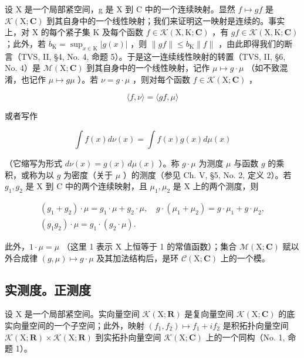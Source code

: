 设 X 是一个局部紧空间，g 是 X 到 C 中的一个连续映射。显然 \(f \mapsto gf\) 是 \(\mathcal{K}(\mathrm{X};\mathbf{C})\) 到其自身中的一个线性映射；我们来证明这一映射是连续的。事实上，对 X 的每个紧子集 K 及每个函数 \(f \in \mathcal{K}(\mathrm{X},\mathrm{K};\mathbf{C})\) ，有 \(gf \in \mathcal{K}(\mathrm{X},\mathrm{K};\mathbf{C})\) ；此外，若 \(b_{\mathrm{K}} = \sup_{x \in \mathrm{K}} |g(x)|\) ，则 \(\|gf\| \leqslant b_{\mathrm{K}} \|f\|\) ，由此即得我们的断言（TVS, II, §4, No. 4, 命题 5）。于是这一连续线性映射的转置（TVS, II, §6, No. 4）是 \(\mathcal{M}(\mathrm{X};\mathbf{C})\) 到其自身中的一个线性映射，记作 \(\mu \mapsto g \cdot \mu\) （如不致混淆，也记作 \(\mu \mapsto g\mu\) ）。若 \(\nu = g \cdot \mu\) ，则对每个函数 \(f \in \mathcal{K}(\mathrm{X};\mathbf{C})\) ，

\[
\langle f, \nu \rangle = \langle g f, \mu \rangle\tag{6}
\]

或者写作

\[
\int f (x) d \nu (x) = \int f (x) g (x) d \mu (x)
\]

（它缩写为形式 \(d\nu(x) = g(x) \, d\mu(x)\) ）。称 \(g \cdot \mu\) 为测度 \(\mu\) 与函数 \(g\) 的乘积，或称为以 \(g\) 为密度（关于 \(\mu\) ）的测度（参见 Ch. V, §5, No. 2, 定义 2）。若 \(g_1, g_2\) 是 X 到 C 中的两个连续映射，且 \(\mu_1, \mu_2\) 是 X 上的两个测度，则

\[
\begin{array}{c} (g _ {1} + g _ {2}) \cdot \mu = g _ {1} \cdot \mu + g _ {2} \cdot \mu , \quad g \cdot (\mu_ {1} + \mu_ {2}) = g \cdot \mu_ {1} + g \cdot \mu_ {2}, \\ (g _ {1} g _ {2}) \cdot \mu = g _ {1} \cdot (g _ {2} \cdot \mu). \end{array}
\]

此外，\(1 \cdot \mu = \mu\) （这里 1 表示 X 上恒等于 1 的常值函数）；集合 \(\mathcal{M}(\mathrm{X};\mathbf{C})\) 赋以外合成律 \((g,\mu) \mapsto g \cdot \mu\) 及其加法结构后，是环 \(\mathcal{C}(\mathrm{X};\mathbf{C})\) 上的一个模。

\subsection{实测度。正测度}

设 X 是一个局部紧空间。实向量空间 \(\mathcal{K}(\mathrm{X};\mathbf{R})\) 是复向量空间 \(\mathcal{K}(\mathrm{X};\mathbf{C})\) 的底实向量空间的一个子空间；此外，映射 \((f_{1},f_{2})\mapsto f_{1}+if_{2}\) 是积拓扑向量空间 \(\mathcal{K}(\mathrm{X};\mathbf{R})\times\mathcal{K}(\mathrm{X};\mathbf{R})\) 到实拓扑向量空间 \(\mathcal{K}(\mathrm{X};\mathbf{C})\) 上的一个同构（No. 1, 命题 1）。

